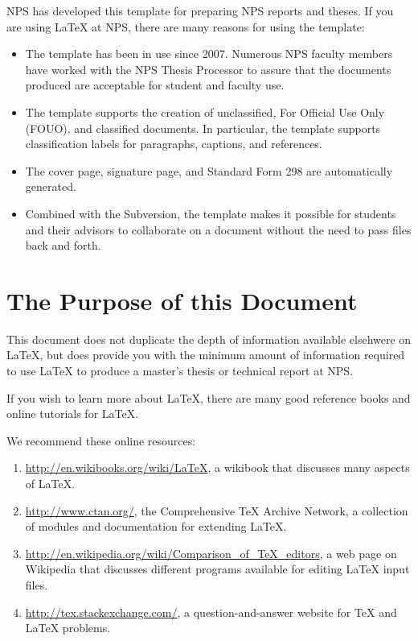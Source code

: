 NPS has developed this template for preparing NPS reports and theses. If
you are using \LaTeX{} at NPS, there are many reasons for using the
template:

\begin{itemize}
\item The template has been in use since 2007. Numerous NPS
  faculty members have worked with the NPS Thesis Processor to assure
  that the documents produced are acceptable for student and faculty
  use.
\item The template supports the creation of unclassified, For Official Use Only (FOUO), and
  classified documents. In particular, the template supports
  classification labels for paragraphs, captions, and references.
\item The cover page, signature page, and Standard Form 298 are automatically generated.
\item Combined with the Subversion, the template makes it possible for students
  and their advisors to collaborate on a document without the need to pass files back and forth. 
\end{itemize}


\section{The Purpose of this Document}

This document does not duplicate the depth of information
available elsehwere on \LaTeX{},
but does provide you with the minimum amount of information required to use \LaTeX{}
to produce a master's thesis or technical report at NPS.

If you wish to learn more about \LaTeX, there are many good reference
books and online tutorials for \LaTeX{}.

We recommend these online resources:
\begin{enumerate}
\item \url{http://en.wikibooks.org/wiki/LaTeX}, a wikibook that
  discusses many aspects of \LaTeX.
\item \url{http://www.ctan.org/}, the Comprehensive \TeX{} Archive
  Network, a collection of modules and documentation for extending \LaTeX{}.
\item \url{http://en.wikipedia.org/wiki/Comparison_of_TeX_editors}, a
  web page on Wikipedia that discusses different programs available for editing \LaTeX{} input files.
\item \url{http://tex.stackexchange.com/}, a question-and-answer website for \TeX{} and \LaTeX{} problems.
\end{enumerate}

